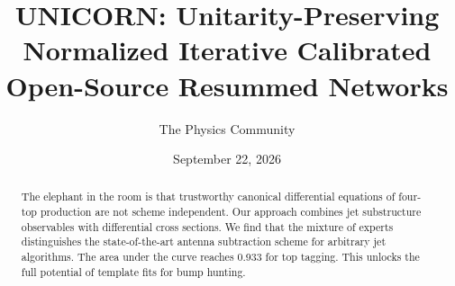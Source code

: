 \documentclass[11pt]{article}
\title{UNICORN: Unitarity-Preserving Normalized Iterative Calibrated Open-Source Resummed Networks}
\author{The Physics Community}
\date{September 22, 2026}
\numberwithin{equation}{section}
\theoremstyle{definition}
\theoremstyle{remark}
\begin{document}
\maketitle
\begin{abstract}
The elephant in the room is that trustworthy canonical differential
equations of four-top production are not scheme independent. Our
approach combines jet substructure observables with differential cross
sections. We find that the mixture of experts distinguishes the
state-of-the-art antenna subtraction scheme for arbitrary jet
algorithms. The area under the curve reaches 0.933 for top tagging. This
unlocks the full potential of template fits for bump hunting.
\end{abstract}
\tableofcontents




\nocite{*}


\end{document}
